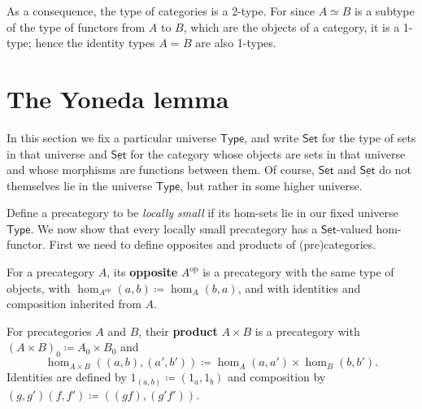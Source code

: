 \documentclass{amsart}
\newcommand{\defeq}{\coloneqq}  %
\newcommand{\id}[3][]{\ensuremath{#2 =_{#1} #3}\xspace}
\newcommand{\type}{\ensuremath{\mathsf{Type}}\xspace}
\renewcommand{\set}{\ensuremath{\mathsf{Set}}\xspace}
\newcommand{\uset}{\ensuremath{\underline{\set}}\xspace}
\theoremstyle{definition}
\theoremstyle{remark}
\numberwithin{equation}{section}
\newcommand{\op}{^{\textrm{op}}}
\begin{document}
As a consequence, the type of categories is a 2-type.
For since $A\simeq B$ is a subtype of the type of functors from $A$ to $B$, which are the objects of a category, it is a 1-type; hence the identity types $\id A B$ are also 1-types.


\section{The Yoneda lemma}
\label{sec:yoneda}

In this section we fix a particular universe \type, and write \set for the type of sets in that universe and \uset for the category whose objects are sets in that universe and whose morphisms are functions between them.
Of course, \set and \uset do not themselves lie in the universe \type, but rather in some higher universe.

Define a precategory to be \emph{locally small} if its hom-sets lie in our fixed universe \type.
We now show that every locally small precategory has a \uset-valued hom-functor.
First we need to define opposites and products of (pre)categories.

\begin{defn}
  For a precategory $A$, its \textbf{opposite} $A\op$ is a precategory with the same type of objects, with $\hom_{A\op}(a,b) \defeq \hom_A(b,a)$, and with identities and composition inherited from $A$.
\end{defn}

\begin{defn}
  For precategories $A$ and $B$, their \textbf{product} $A\times B$ is a precategory with $(A\times B)_0 \defeq A_0 \times B_0$ and
  \[\hom_{A\times B}((a,b),(a',b')) \defeq \hom_A(a,a') \times \hom_B(b,b').\]
  Identities are defined by $1_{(a,b)}\defeq (1_a,1_b)$ and composition by $(g,g')(f,f') \defeq ((gf),(g'f'))$.
\end{defn}
\end{document}
